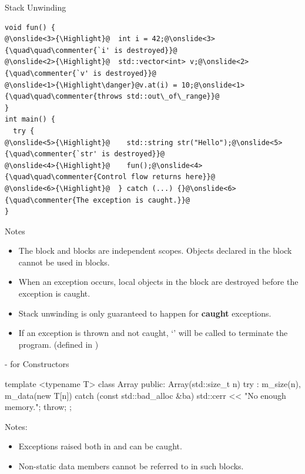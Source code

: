 \documentclass{beamer}
\newcommand{\Highlight}{\makebox[0pt][l]{\color{pink}\rule[-4pt]{\textwidth}{11pt}}}
\begin{document}
\begin{frame}[fragile]{Stack Unwinding}
    \begin{lstlisting}[language = {[11]C++}, escapechar = \@]
void fun() {
@\onslide<3>{\Highlight}@  int i = 42;@\onslide<3>{\quad\quad\commenter{`i' is destroyed}}@
@\onslide<2>{\Highlight}@  std::vector<int> v;@\onslide<2>{\quad\commenter{`v' is destroyed}}@
@\onslide<1>{\Highlight\danger}@v.at(i) = 10;@\onslide<1>{\quad\quad\commenter{throws std::out\_of\_range}}@
}
int main() {
  try {
@\onslide<5>{\Highlight}@    std::string str("Hello");@\onslide<5>{\quad\commenter{`str' is destroyed}}@
@\onslide<4>{\Highlight}@    fun();@\onslide<4>{\quad\quad\commenter{Control flow returns here}}@
@\onslide<6>{\Highlight}@  } catch (...) {}@\onslide<6>{\quad\commenter{The exception is caught.}}@
}
    \end{lstlisting}
\end{frame}

\begin{frame}[fragile]{Notes}
    \begin{itemize}
        \item The  block and  blocks are independent scopes. Objects declared in the  block cannot be used in  blocks.
        \item When an exception occurs, local objects in the  block are destroyed before the exception is caught.
        \item Stack unwinding is only guaranteed to happen for \textbf{caught} exceptions.
        \item If an exception is thrown and not caught, `' will be called to terminate the program. (defined in )
    \end{itemize}
\end{frame}

\begin{frame}[fragile]{- for Constructors}
    \begin{cpp}
template <typename T>
class Array {
 public:
  Array(std::size_t n)
      try : m_size(n), m_data(new T[n]{}) {}
  catch (const std::bad_alloc &ba) {
    std::cerr << "No enough memory.\n";
    throw;
  }
};
    \end{cpp}
    Notes:
    \begin{itemize}
        \item Exceptions raised both in  and  can be caught.
        \item Non-static data members cannot be referred to in such  blocks. 
    \end{itemize}
\end{frame}
\end{document}
